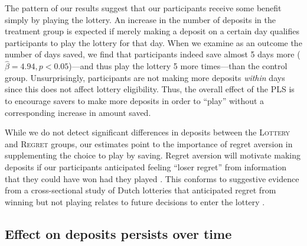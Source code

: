 \documentclass[11pt]{article}
\begin{document}

		The pattern of our results suggest that our participants receive some benefit simply by playing the lottery. An increase in the number of deposits in the treatment group is expected if merely making a deposit on a certain day qualifies participants to play the lottery for that day. When we examine as an outcome the number of days saved, we find that participants indeed save almost 5 days more ($\hat \beta = 4.94, p < 0.05$)---and thus play the lottery 5 more times---than the control group. Unsurprisingly, participants are not making more deposits \textit{within} days since this does not affect lottery eligibility. Thus, the overall effect of the PLS is to encourage savers to make more deposits in order to ``play'' without a corresponding increase in amount saved. %


		While we do not detect significant differences in deposits between the \textsc{Lottery} and \textsc{Regret} groups, our estimates point to the importance of regret aversion in supplementing the choice to play by saving. Regret aversion will motivate making deposits if our participants anticipated feeling ``loser regret'' from information that they could have won had they played . This conforms to suggestive evidence from a cross-sectional study of Dutch lotteries that anticipated regret from winning but not playing relates to future decisions to enter the lottery .



	\subsection{Effect on deposits persists over time}
\end{document}
